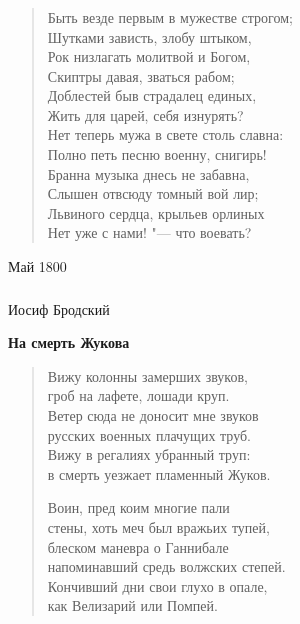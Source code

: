 \documentclass{beamer}
\begin{document}

\begin{frame}
\frametitle{}

\begin{verse}
		\hspace{2em}Быть везде первым в мужестве строгом;\\
Шутками зависть, злобу штыком,\\
Рок низлагать молитвой и Богом,	\\		
Скиптры давая, зваться рабом;\\
Доблестей быв страдалец единых,\\			
Жить для царей, себя изнурять?	\\		
		\hspace{2em}Нет теперь мужа в свете столь славна:\\
Полно петь песню военну, снигирь!	\\
Бранна музыка днесь не забавна,\\
Слышен отвсюду томный вой лир;\\
Львиного сердца, крыльев орлиных\\
Нет уже с нами! "--- что воевать?
\end{verse}

 Май 1800
\end{frame}


\begin{frame}
\frametitle{}
Иосиф Бродский
\begin{center}
\textbf{На смерть Жукова}
\end{center}

\begin{verse}
Вижу колонны замерших звуков,\\
гроб на лафете, лошади круп.\\
Ветер сюда не доносит мне звуков\\
русских военных плачущих труб.\\
Вижу в регалиях убранный труп:\\
в смерть уезжает пламенный Жуков.

Воин, пред коим многие пали\\
стены, хоть меч был вражьих тупей,\\
блеском маневра о Ганнибале\\
напоминавший средь волжских степей.\\
Кончивший дни свои глухо в опале,\\
как Велизарий или Помпей.
\end{verse}
\end{frame}
\end{document}

